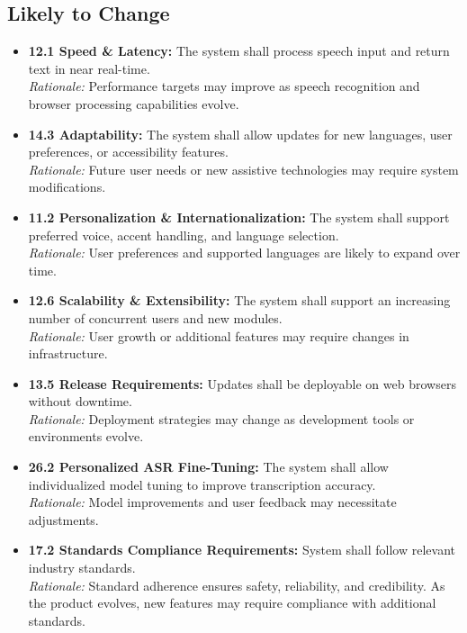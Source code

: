 \documentclass[11pt]{article}
\begin{document}
\subsection{Likely to Change}
\begin{itemize}
    \item \textbf{12.1 Speed \& Latency:} The system shall process speech input and return text in near real-time.\\
    \textit{Rationale:} Performance targets may improve as speech recognition and browser processing capabilities evolve.

    \item \textbf{14.3 Adaptability:} The system shall allow updates for new languages, user preferences, or accessibility features.\\
    \textit{Rationale:} Future user needs or new assistive technologies may require system modifications.

    \item \textbf{11.2 Personalization \& Internationalization:} The system shall support preferred voice, accent handling, and language selection.\\
    \textit{Rationale:} User preferences and supported languages are likely to expand over time.

    \item \textbf{12.6 Scalability \& Extensibility:} The system shall support an increasing number of concurrent users and new modules.\\
    \textit{Rationale:} User growth or additional features may require changes in infrastructure.

    \item \textbf{13.5 Release Requirements:} Updates shall be deployable on web browsers without downtime.\\
    \textit{Rationale:} Deployment strategies may change as development tools or environments evolve.

    \item \textbf{26.2 Personalized ASR Fine-Tuning:} The system shall allow individualized model tuning to improve transcription accuracy.\\
    \textit{Rationale:} Model improvements and user feedback may necessitate adjustments.


    \item \textbf{17.2 Standards Compliance Requirements:} System shall follow relevant industry standards.\\
    \textit{Rationale:} Standard adherence ensures safety, reliability, and credibility. As the product evolves, new features may require compliance with additional standards.
\end{itemize}
\end{document}
